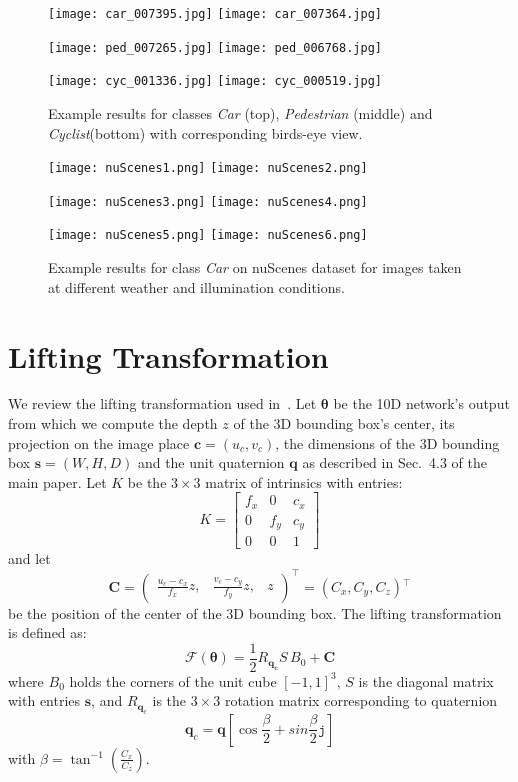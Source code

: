 \documentclass[10pt,twocolumn,letterpaper]{article}
\newcommand{\vct}[1]{\ensuremath{\boldsymbol{#1}}}
\newcommand{\set}[1]{\ensuremath{\mathcal{#1}}}
\newcommand{\T}{\ensuremath{^\top}}
\begin{document}
\begin{figure*}[p]
    \centering
    \texttt{[image: car\_007395.jpg]}
    \texttt{[image: car\_007364.jpg]}

    \vspace{15pt}
    \texttt{[image: ped\_007265.jpg]}
    \texttt{[image: ped\_006768.jpg]}

    \vspace{15pt}
    \texttt{[image: cyc\_001336.jpg]}
    \texttt{[image: cyc\_000519.jpg]}
    \caption{Example results for classes \textit{Car} (top), \textit{Pedestrian} (middle) and \textit{Cyclist}(bottom) with corresponding birds-eye view.}
    \label{fig:car_viz}
\end{figure*}

\begin{figure*}[p]
    \centering
    \texttt{[image: nuScenes1.png]}\hfill
    \texttt{[image: nuScenes2.png]}

    \vspace{15pt}
    \texttt{[image: nuScenes3.png]}\hfill
    \texttt{[image: nuScenes4.png]}

    \vspace{15pt}
    \texttt{[image: nuScenes5.png]}\hfill
    \texttt{[image: nuScenes6.png]}
    \caption{Example results for class \textit{Car} on nuScenes dataset for images taken at different weather and illumination conditions.}
    \label{fig:nuscenesViz}
\end{figure*}

\section{Lifting Transformation}\label{sec:lifting}
We review the lifting transformation used in~\cite{Manhardt_2019_CVPR}.
Let $\vct \theta$ be the 10D network's output from which we compute the depth $z$ of the 3D bounding box's center, its projection on the image place $\vct c=(u_c,v_c)$, the dimensions of the 3D bounding box $\vct s=(W,H,D)$ and the unit quaternion $\vct q$ as described in Sec.~4.3 of the main paper. Let $K$ be the $3\times 3$ matrix of intrinsics with entries:
\[
K=
\begin{bmatrix}
f_x&0&c_x\\
0&f_y&c_y\\
0&0&1
\end{bmatrix}
\]
and let
\[
\vct C=
\begin{pmatrix}
\frac{u_c-c_x}{f_x}z,&
\frac{v_c-c_y}{f_y}z,&
z
\end{pmatrix}^\top=(C_x,C_y,C_z)\T
\]
be the position of the center of the 3D bounding box.
The lifting transformation is defined as:
\[
\set F(\vct \theta)= \frac{1}{2}R_{\vct q_{\vct c}}S\,B_0+\vct C
\]
where $B_0$ holds the corners of the unit cube $[-1,1]^3$, $S$ is the diagonal matrix with entries $\vct s$, and $R_{\vct q_c}$ is the $3\times 3$ rotation matrix corresponding to quaternion 
\[
\vct q_c=\vct q 
\left[\cos \frac{\beta}{2} +sin \frac{\beta}{2} \mathtt j\right]
\]
with $\beta=\tan^{-1}(\frac{C_x}{C_z})$.
\end{document}
